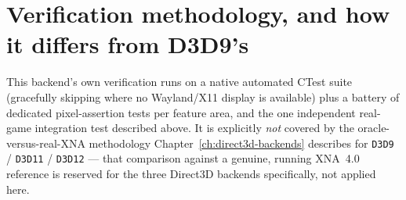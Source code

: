 \section{Verification methodology, and how it differs from D3D9's}

This backend's own verification runs on a native automated CTest suite (gracefully skipping
where no Wayland/X11 display is available) plus a battery of dedicated pixel-assertion tests
per feature area, and the one independent real-game integration test described above. It is
explicitly \emph{not} covered by the oracle-versus-real-XNA methodology
Chapter~\ref{ch:direct3d-backends} describes for \texttt{D3D9} / \texttt{D3D11} / \texttt{D3D12}
--- that comparison against a genuine, running XNA~4.0 reference is reserved for the three
Direct3D backends specifically, not applied here.

